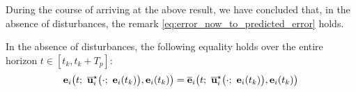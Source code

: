 During the course of arriving at the above result, we have concluded that,
in the absence of disturbances, the remark \eqref{eq:error_now_to_predicted_error}
holds.
\begin{bw_box}
  \begin{remark}
  \label{eq:error_now_to_predicted_error}
    In the absence of disturbances, the following equality holds over
    the entire horizon $t \in [t_k, t_k + T_p]$:
    \begin{align}
      \vect{e}_i\big(t;\ \overline{\vect{u}}_i^{\star}\big(\cdot;\ \vect{e}_i(t_k)\big), \vect{e}_i(t_k)\big)
        =\overline{\vect{e}}_i\big(t;\ \overline{\vect{u}}_i^{\star}\big(\cdot;\ \vect{e}_i(t_k)\big), \vect{e}_i(t_k)\big)
    \end{align}
  \end{remark}
\end{bw_box}

